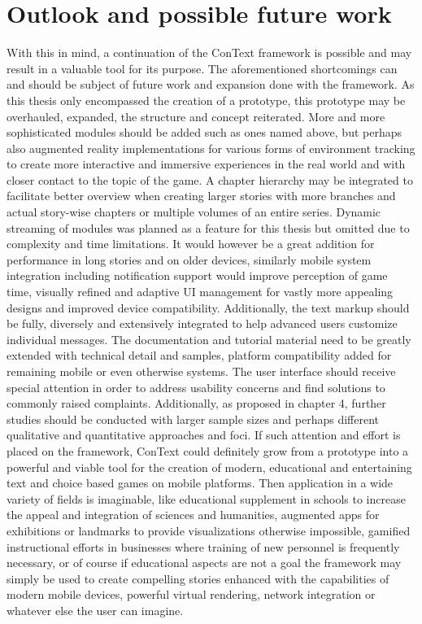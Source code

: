 \section{Outlook and possible future work}
With this in mind, a continuation of the ConText framework is possible and may result in a valuable tool for its purpose. 
The aforementioned shortcomings can and should be subject of future work and expansion done with the framework. As this thesis only encompassed the creation of a prototype, this prototype may be overhauled, expanded, the structure and concept reiterated. 
More and more sophisticated modules should be added such as ones named above, but perhaps also augmented reality implementations for various forms of environment tracking to create more interactive and immersive experiences in the real world and with closer contact to the topic of the game. A chapter hierarchy may be integrated to facilitate better overview when creating larger stories with more branches and actual story-wise chapters or multiple volumes of an entire series.
Dynamic streaming of modules was planned as a feature for this thesis but omitted due to complexity and time limitations. It would however be a great addition for performance in long stories and on older devices, similarly mobile system integration including notification support would improve perception of game time, visually refined and adaptive UI management for vastly more appealing designs and improved device compatibility. Additionally, the text markup should be fully, diversely and extensively integrated to help advanced users customize individual messages. The documentation and tutorial material need to be greatly extended with technical detail and samples, platform compatibility added for remaining mobile or even otherwise systems. The user interface should receive special attention in order to address usability concerns and find solutions to commonly raised complaints.
Additionally, as proposed in chapter 4, further studies should be conducted with larger sample sizes and perhaps different qualitative and quantitative approaches and foci.
If such attention and effort is placed on the framework, ConText could definitely grow from a prototype into a powerful and viable tool for the creation of modern, educational and entertaining text and choice based games on mobile platforms. Then application in a wide variety of fields is imaginable, like educational supplement in schools to increase the appeal and integration of sciences and humanities, augmented apps for exhibitions or landmarks to provide visualizations otherwise impossible, gamified instructional efforts in businesses where training of new personnel is frequently necessary, or of course if educational aspects are not a goal the framework may simply be used to create compelling stories enhanced with the capabilities of modern mobile devices, powerful virtual rendering, network integration or whatever else the user can imagine.